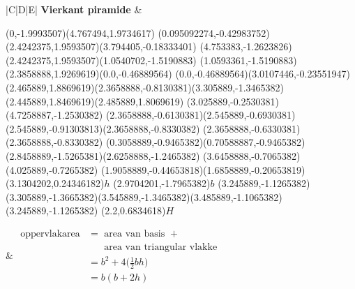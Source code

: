 \begin{table}[H]
\begin{tabular}{|C|D|E|}
\hline
\textbf{Vierkant piramide}
&
\begin{center}

\scalebox{0.7} %
{
\begin{pspicture}(0,-1.9993507)(4.767494,1.9734617)
\pspolygon[linewidth=0.028222222,fillstyle=solid](0.095092274,-0.42983752)(2.4242375,1.9593507)(3.794405,-0.18333401)
\pspolygon[linewidth=0.028222222,fillstyle=solid](4.753383,-1.2623826)(2.4242375,1.9593507)(1.0540702,-1.5190883)
\pspolygon[linewidth=0.028222222,fillstyle=solid](1.0593361,-1.5190883)(2.3858888,1.9269619)(0.0,-0.46889564)
\psline[linewidth=0.022cm,linestyle=dashed,dash=0.16cm 0.16cm](0.0,-0.46889564)(3.0107446,-0.23551947)
\psline[linewidth=0.027999999,linestyle=dotted,dotsep=0.16cm](2.465889,1.8869619)(2.3658888,-0.8130381)(3.305889,-1.3465382)(2.445889,1.8469619)(2.485889,1.8069619)
\psline[linewidth=0.024cm,linestyle=dashed,dash=0.16cm 0.16cm](3.025889,-0.2530381)(4.7258887,-1.2530382)
\psline[linewidth=0.02](2.3658888,-0.6130381)(2.545889,-0.6930381)(2.545889,-0.91303813)(2.3658888,-0.8330382)
\psline[linewidth=0.02cm](2.3658888,-0.6330381)(2.3658888,-0.8330382)
\psline[linewidth=0.04cm](0.3058889,-0.9465382)(0.70588887,-0.9465382)
\psline[linewidth=0.04cm](2.8458889,-1.5265381)(2.6258888,-1.2465382)
\psline[linewidth=0.04cm](3.6458888,-0.7065382)(4.025889,-0.7265382)
\psline[linewidth=0.04cm](1.9058889,-0.44653818)(1.6858889,-0.20653819)
\rput(3.1304202,0.24346182){$h$}
\rput(2.9704201,-1.7965382){$b$}
\psline[linewidth=0.02](3.245889,-1.1265382)(3.305889,-1.3665382)(3.545889,-1.3465382)(3.485889,-1.1065382)(3.245889,-1.1265382)
\rput(2.2,0.6834618){$H$}
\end{pspicture} 
}
\end{center} 
&
$\begin{aligned}
\mbox{oppervlakarea} &= \mbox{ area van basis } +\\
&~~~~~~\mbox{ area van triangular vlakke } \\
&=b^{2} + 4\Big(\frac{1}{2}bh\Big)\\
&=b(b+2h)
 \end{aligned}$
\\ \hline



\end{tabular}
\end{table}
